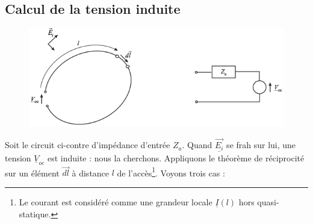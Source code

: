 	\subsection{Calcul de la tension induite}
	\begin{figure}
	\vspace{-15mm}
	\includegraphics[scale=0.25]{ch4/image4.png}
	\end{figure}
	Soit le circuit ci-contre d'impédance d'entrée $Z_a$. Quand $\underline{\vec{E_i}}$ se frah 
	sur lui, une tension $\underline{V}_{oc}$ est induite : nous la cherchons. Appliquons le 
	théorème de réciprocité sur un élément $\vec{dl}$ à distance $l$ de l'accès\footnote{Le courant 
	est considéré comme une grandeur locale $\underline{I}(l)$ hors quasi-statique.}. Voyons 
	trois cas :
